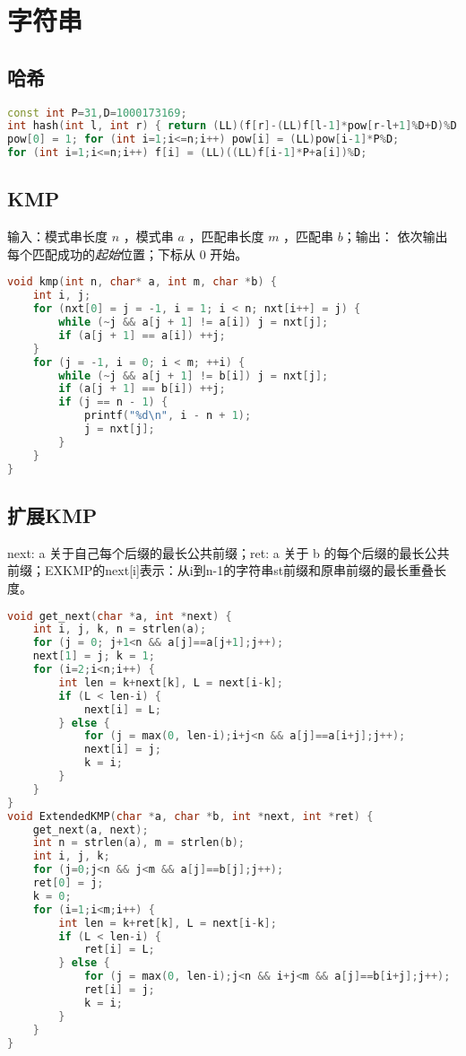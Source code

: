 \documentclass{article}
\begin{document}
\section{字符串}
\subsection{哈希}
\begin{lstlisting}[language=C++]
const int P=31,D=1000173169;
int hash(int l, int r) { return (LL)(f[r]-(LL)f[l-1]*pow[r-l+1]%D+D)%D; }
pow[0] = 1;	for (int i=1;i<=n;i++) pow[i] = (LL)pow[i-1]*P%D;
for (int i=1;i<=n;i++) f[i] = (LL)((LL)f[i-1]*P+a[i])%D;
\end{lstlisting}
\subsection{KMP}
输入：模式串长度 $n$ ，模式串 $a$ ，匹配串长度 $m$ ，匹配串 $b$；输出： 依次输出每个匹配成功的\emph{起始}位置；下标从 $0$ 开始。

\begin{lstlisting}[language=C++]
void kmp(int n, char* a, int m, char *b) {
    int i, j;
    for (nxt[0] = j = -1, i = 1; i < n; nxt[i++] = j) {
        while (~j && a[j + 1] != a[i]) j = nxt[j];
        if (a[j + 1] == a[i]) ++j;
    }
    for (j = -1, i = 0; i < m; ++i) {
        while (~j && a[j + 1] != b[i]) j = nxt[j];
        if (a[j + 1] == b[i]) ++j;
        if (j == n - 1) {
            printf("%d\n", i - n + 1);
            j = nxt[j];
        }
    }
}
\end{lstlisting}

\subsection{扩展KMP}

next:  a 关于自己每个后缀的最长公共前缀；ret: a 关于 b 的每个后缀的最长公共前缀；EXKMP的next[i]表示：从i到n-1的字符串st前缀和原串前缀的最长重叠长度。

\begin{lstlisting}[language=C++]
void get_next(char *a, int *next) {
	int i, j, k, n = strlen(a);
	for (j = 0; j+1<n && a[j]==a[j+1];j++);
	next[1] = j; k = 1;
	for (i=2;i<n;i++) {
		int len = k+next[k], L = next[i-k];
		if (L < len-i) {
			next[i] = L;
		} else {
			for (j = max(0, len-i);i+j<n && a[j]==a[i+j];j++);
			next[i] = j;
			k = i;
		}
	}
}
void ExtendedKMP(char *a, char *b, int *next, int *ret) {
	get_next(a, next);
	int n = strlen(a), m = strlen(b);
	int i, j, k;
	for (j=0;j<n && j<m && a[j]==b[j];j++);
	ret[0] = j;
	k = 0;
	for (i=1;i<m;i++) {
		int len = k+ret[k], L = next[i-k];
		if (L < len-i) {
			ret[i] = L;
		} else {
			for (j = max(0, len-i);j<n && i+j<m && a[j]==b[i+j];j++);
			ret[i] = j;
			k = i;
		}
	}
}
\end{lstlisting}
\end{document}
